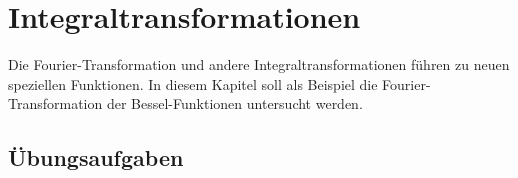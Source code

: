 %
%
%
\chapter{Integraltransformationen
\label{buch:chapter:fourier}}
\rhead{}
Die Fourier-Transformation und andere Integraltransformationen
führen zu neuen speziellen Funktionen.
In diesem Kapitel soll als Beispiel die Fourier-Transformation
der Bessel-Funktionen untersucht werden.

%


\section*{Übungsaufgaben}
\begin{uebungsaufgaben}
\end{uebungsaufgaben}

